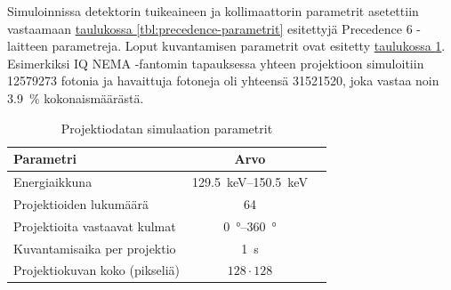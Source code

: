 Simuloinnissa detektorin tuikeaineen ja kollimaattorin parametrit asetettiin vastaamaan \hyperref[tbl:precedence-parametrit]{taulukossa \ref*{tbl:precedence-parametrit}} esitettyjä Precedence 6 -laitteen parametreja\cite{peters_towards_2019}. Loput kuvantamisen parametrit ovat esitetty \hyperref[tbl:simulaation_parametrit]{taulukossa \ref*{tbl:simulaation_parametrit}}. Esimerkiksi IQ NEMA -fantomin tapauksessa yhteen projektioon simuloitiin 12579273 fotonia ja havaittuja fotoneja oli yhteensä 31521520, joka vastaa noin \qty{3.9}{\percent} kokonaismäärästä.
\begin{table}[H]
    \centering
    \captionsetup{width=.9\linewidth}
    \caption{Projektiodatan simulaation parametrit}
        \begin{tabular}{lcc}
            \toprule
            Parametri & Arvo & \\
            \midrule
            Energiaikkuna & \qtyrange{129.5}{150.5}{\kilo\electronvolt}\\
            Projektioiden lukumäärä & 64\\
            Projektioita vastaavat kulmat & \qtyrange{0}{360}{\degree}\\
            Kuvantamisaika per projektio & \qty{1}{\second}\\
            Projektiokuvan koko (pikseliä) & $128\cdot 128$\\
            \bottomrule
        \end{tabular}
    \label{tbl:simulaation_parametrit}
\end{table}